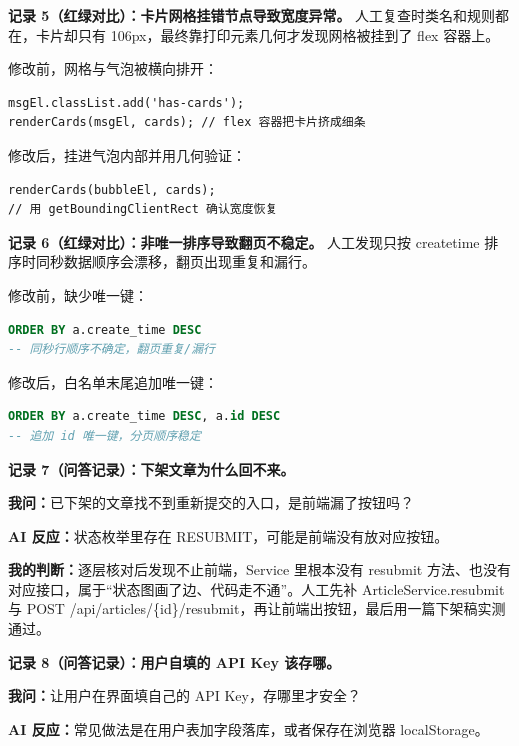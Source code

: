 \documentclass[zihao=-4,UTF8,openany]{ctexart}
\renewcommand{\_}{\textunderscore\allowbreak}
\begin{document}
\noindent\textbf{记录 5（红绿对比）：卡片网格挂错节点导致宽度异常。} 人工复查时类名和规则都在，卡片却只有 106px，最终靠打印元素几何才发现网格被挂到了 flex 容器上。

修改前，网格与气泡被横向排开：

\begin{lstlisting}[style=fixBefore]
msgEl.classList.add('has-cards');
renderCards(msgEl, cards); // flex 容器把卡片挤成细条
\end{lstlisting}

修改后，挂进气泡内部并用几何验证：

\begin{lstlisting}[style=fixAfter]
renderCards(bubbleEl, cards);
// 用 getBoundingClientRect 确认宽度恢复
\end{lstlisting}

\noindent\textbf{记录 6（红绿对比）：非唯一排序导致翻页不稳定。} 人工发现只按 create\_time 排序时同秒数据顺序会漂移，翻页出现重复和漏行。

修改前，缺少唯一键：

\begin{lstlisting}[style=fixBefore,language=SQL]
ORDER BY a.create_time DESC
-- 同秒行顺序不确定，翻页重复/漏行
\end{lstlisting}

修改后，白名单末尾追加唯一键：

\begin{lstlisting}[style=fixAfter,language=SQL]
ORDER BY a.create_time DESC, a.id DESC
-- 追加 id 唯一键，分页顺序稳定
\end{lstlisting}

\noindent\textbf{记录 7（问答记录）：下架文章为什么回不来。}

\noindent\textbf{我问：}已下架的文章找不到重新提交的入口，是前端漏了按钮吗？

\noindent\textbf{AI 反应：}状态枚举里存在 RESUBMIT，可能是前端没有放对应按钮。

\noindent\textbf{我的判断：}逐层核对后发现不止前端，Service 里根本没有 resubmit 方法、也没有对应接口，属于“状态图画了边、代码走不通”。人工先补 ArticleService.resubmit 与 POST /api/articles/\{id\}/resubmit，再让前端出按钮，最后用一篇下架稿实测通过。

\noindent\textbf{记录 8（问答记录）：用户自填的 API Key 该存哪。}

\noindent\textbf{我问：}让用户在界面填自己的 API Key，存哪里才安全？

\noindent\textbf{AI 反应：}常见做法是在用户表加字段落库，或者保存在浏览器 localStorage。
\end{document}
